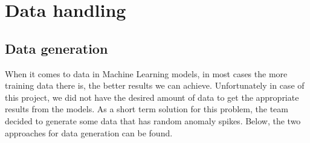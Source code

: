  \section{Data handling}
        \subsection{Data generation}
        When it comes to data in Machine Learning models, in most cases the more training data there is, the better results we can achieve. Unfortunately in case of this project, we did not have the desired amount of data to get the appropriate results from the models. As a short term solution for this problem, the team decided to generate some data that has random anomaly spikes. Below, the two approaches for data generation can be found. \\

